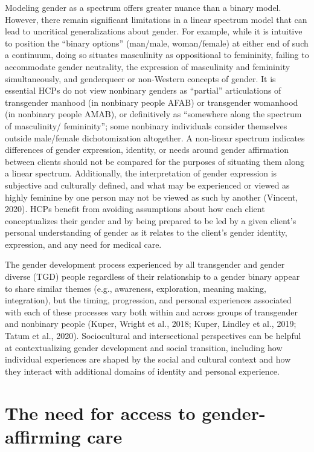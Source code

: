 \documentclass[
]{book}
\begin{document}
Modeling gender as a spectrum offers greater
nuance than a binary model. However, there
remain significant limitations in a linear spectrum
model that can lead to uncritical generalizations
about gender. For example, while it is intuitive
to position the ``binary options'' (man/male,
woman/female) at either end of such a continuum, doing so situates masculinity as oppositional
to femininity, failing to accommodate gender neutrality, the expression of masculinity and femininity simultaneously, and genderqueer or
non-Western concepts of gender. It is essential
HCPs do not view nonbinary genders as ``partial''
articulations of transgender manhood (in nonbinary people AFAB) or transgender womanhood
(in nonbinary people AMAB), or definitively as
``somewhere along the spectrum of masculinity/
femininity''; some nonbinary individuals consider
themselves outside male/female dichotomization
altogether. A non-linear spectrum indicates differences of gender expression, identity, or needs
around gender affirmation between clients should
not be compared for the purposes of situating
them along a linear spectrum. Additionally, the
interpretation of gender expression is subjective
and culturally defined, and what may be experienced or viewed as highly feminine by one person
may not be viewed as such by another (Vincent,
2020). HCPs benefit from avoiding assumptions
about how each client conceptualizes their gender
and by being prepared to be led by a given client's
personal understanding of gender as it relates to
the client's gender identity, expression, and any
need for medical care.

The gender development process experienced
by all transgender and gender diverse (TGD)
people regardless of their relationship to a gender
binary appear to share similar themes (e.g.,
awareness, exploration, meaning making, integration), but the timing, progression, and personal
experiences associated with each of these processes vary both within and across groups of
transgender and nonbinary people (Kuper, Wright
et al., 2018; Kuper, Lindley et al., 2019; Tatum
et al., 2020). Sociocultural and intersectional perspectives can be helpful at contextualizing gender
development and social transition, including how
individual experiences are shaped by the social
and cultural context and how they interact with
additional domains of identity and personal
experience.

\hypertarget{the-need-for-access-to-gender-affirming-care}{%
\section*{The need for access to gender-affirming care}\label{the-need-for-access-to-gender-affirming-care}}
\end{document}
